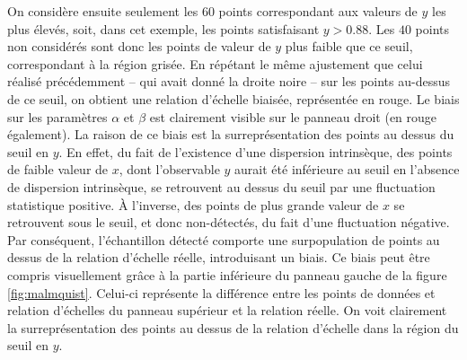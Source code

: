 On considère ensuite seulement les $60$ points correspondant aux valeurs de $y$ les plus élevés, soit, dans cet exemple, les points satisfaisant $y > 0.88$.
Les $40$ points non considérés sont donc les points de valeur de $y$ plus faible que ce seuil, correspondant à la région grisée.
En répétant le même ajustement que celui réalisé précédemment -- qui avait donné la droite noire -- sur les points au-dessus de ce seuil, on obtient une relation d'échelle biaisée, représentée en rouge.
Le biais sur les paramètres $\alpha$ et $\beta$ est clairement visible sur le panneau droit (en rouge également).
La raison de ce biais est la surreprésentation des points au dessus du seuil en $y$.
En effet, du fait de l'existence d'une dispersion intrinsèque, des points de faible valeur de $x$, dont l'observable $y$ aurait été inférieure au seuil en l'absence de dispersion intrinsèque, se retrouvent au dessus du seuil par une fluctuation statistique positive.
À l'inverse, des points de plus grande valeur de $x$ se retrouvent sous le seuil, et donc non-détectés, du fait d'une fluctuation négative.
Par conséquent, l'échantillon détecté comporte une surpopulation de points au dessus de la relation d'échelle réelle, introduisant un biais.
Ce biais peut être compris visuellement grâce à la partie inférieure du panneau gauche de la figure \ref{fig:malmquist}.
Celui-ci représente la différence entre les points de données et relation d'échelles du panneau supérieur et la relation réelle.
On voit clairement la surreprésentation des points au dessus de la relation d'échelle dans la région du seuil en $y$.

